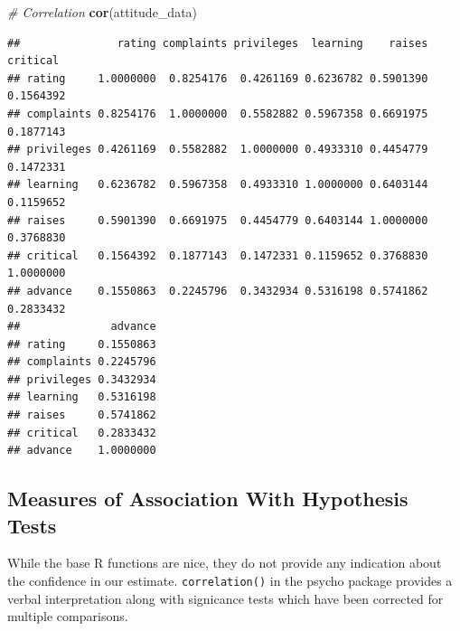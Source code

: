 \documentclass[]{book}
\newenvironment{Shaded}{\begin{snugshade}}{\end{snugshade}}
\newcommand{\CommentTok}[1]{\textcolor[rgb]{0.56,0.35,0.01}{\textit{#1}}}
\newcommand{\KeywordTok}[1]{\textcolor[rgb]{0.13,0.29,0.53}{\textbf{#1}}}
\newcommand{\NormalTok}[1]{#1}
\newcommand{\OperatorTok}[1]{\textcolor[rgb]{0.81,0.36,0.00}{\textbf{#1}}}
\theoremstyle{definition}
\theoremstyle{definition}
\theoremstyle{definition}
\theoremstyle{remark}
\begin{document}
\begin{Shaded}
\begin{Highlighting}[]
\CommentTok{# Correlation}
\KeywordTok{cor}\NormalTok{(attitude_data)}
\end{Highlighting}
\end{Shaded}

\begin{verbatim}
##               rating complaints privileges  learning    raises  critical
## rating     1.0000000  0.8254176  0.4261169 0.6236782 0.5901390 0.1564392
## complaints 0.8254176  1.0000000  0.5582882 0.5967358 0.6691975 0.1877143
## privileges 0.4261169  0.5582882  1.0000000 0.4933310 0.4454779 0.1472331
## learning   0.6236782  0.5967358  0.4933310 1.0000000 0.6403144 0.1159652
## raises     0.5901390  0.6691975  0.4454779 0.6403144 1.0000000 0.3768830
## critical   0.1564392  0.1877143  0.1472331 0.1159652 0.3768830 1.0000000
## advance    0.1550863  0.2245796  0.3432934 0.5316198 0.5741862 0.2833432
##              advance
## rating     0.1550863
## complaints 0.2245796
## privileges 0.3432934
## learning   0.5316198
## raises     0.5741862
## critical   0.2833432
## advance    1.0000000
\end{verbatim}

\hypertarget{measures-of-association-with-hypothesis-tests}{%
\subsection{Measures of Association With Hypothesis Tests}\label{measures-of-association-with-hypothesis-tests}}

While the base R functions are nice, they do not provide any indication about the confidence in our estimate. \texttt{correlation()} in the psycho package provides a verbal interpretation along with signicance tests which have been corrected for multiple comparisons.

\begin{Shaded}
\end{Shaded}
\end{document}
